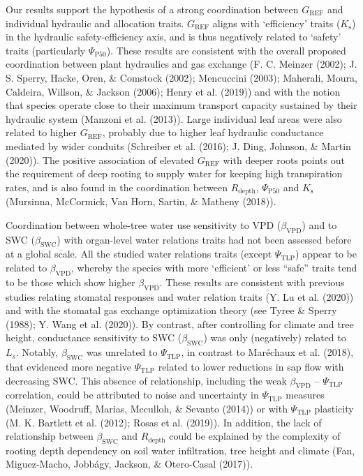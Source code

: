 \documentclass[11pt,twoside]{reedthesis}
\begin{document}
Our results support the hypothesis of a strong coordination between
\(G_{\text{REF}}\) and individual hydraulic and allocation traits.
\(G_{\text{REF}}\) aligns with `efficiency' traits (\(K_\text{s}\)) in
the hydraulic safety-efficiency axis, and is thus negatively related to
`safety' traits (particularly \(\Psi_{\text{P50}}\)). These results are
consistent with the overall proposed coordination between plant
hydraulics and gas exchange (F. C. Meinzer (2002); J. S. Sperry, Hacke,
Oren, \& Comstock (2002); Mencuccini (2003); Maherali, Moura, Caldeira,
Willson, \& Jackson (2006); Henry et al. (2019)) and with the notion
that species operate close to their maximum transport capacity sustained
by their hydraulic system (Manzoni et al. (2013)). Large individual leaf
areas were also related to higher \(G_{\text{REF}}\), probably due to
higher leaf hydraulic conductance mediated by wider conduits (Schreiber
et al. (2016); J. Ding, Johnson, \& Martin (2020)). The positive
association of elevated \(G_{\text{REF}}\) with deeper roots points out
the requirement of deep rooting to supply water for keeping high
transpiration rates, and is also found in the coordination between
\(R_{\text{depth}}\), \(\Psi_{\text{P50}}\) and \(K_\text{s}\)
(Mursinna, McCormick, Van Horn, Sartin, \& Matheny (2018)).\par

Coordination between whole-tree water use sensitivity to VPD
(\(\beta_{\text{VPD}}\)) and to SWC (\(\beta_{\text{SWC}}\)) with
organ-level water relations traits had not been assessed before at a
global scale. All the studied water relations traits (except
\(\Psi_{\text{TLP}}\)) appear to be related to \(\beta_{\text{VPD}}\),
whereby the species with more `efficient' or less ``safe'' traits tend
to be those which show higher \(\beta_{\text{VPD}}\). These results are
consistent with previous studies relating stomatal responses and water
relation traits (Y. Lu et al. (2020)) and with the stomatal gas exchange
optimization theory (see Tyree \& Sperry (1988); Y. Wang et al. (2020)).
By contrast, after controlling for climate and tree height, conductance
sensitivity to SWC (\(\beta_{\text{SWC}}\)) was only (negatively)
related to \(L_s\). Notably, \(\beta_{\text{SWC}}\) was unrelated to
\(\Psi_{\text{TLP}}\), in contrast to Maréchaux et al. (2018), that
evidenced more negative \(\Psi_{\text{TLP}}\) related to lower
reductions in sap flow with decreasing SWC. This absence of
relationship, including the weak \(\beta_{\text{VPD}}\) --
\(\Psi_{\text{TLP}}\) correlation, could be attributed to noise and
uncertainty in \(\Psi_{\text{TLP}}\) measures (Meinzer, Woodruff,
Marias, Mcculloh, \& Sevanto (2014)) or with \(\Psi_{\text{TLP}}\)
plasticity (M. K. Bartlett et al. (2012); Rosas et al. (2019)). In
addition, the lack of relationship between \(\beta_{\text{SWC}}\) and
\(R_{\text{depth}}\) could be explained by the complexity of rooting
depth dependency on soil water infiltration, tree height and climate
(Fan, Miguez-Macho, Jobbágy, Jackson, \& Otero-Casal (2017)).\par
\end{document}
